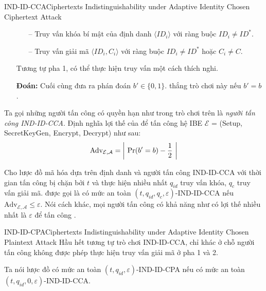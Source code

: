 \documentclass[class=report, crop=false]{standalone}
\begin{document}
\begin{game}{IND-ID-CCA}{Ciphertexts Indistinguishability under Adaptive Identity Chosen Ciphertext Attack}
\begin{itemize}[leftmargin=1.5cm, itemindent=-0.5cm]
					\begin{itemize}
						\item[--] Truy vấn khóa bí mật của định danh $\langle ID_i \rangle$ với ràng buộc $ID_i \neq ID^*$.
						\item[--] Truy vấn giải mã $\langle ID_i, C_i \rangle$ với ràng buộc $ID_i \neq ID^*$ hoặc $C_i \neq C$.
					\end{itemize}
					Tương tự pha 1, \adversary có thể thực hiện truy vấn một cách thích nghi.
					\item[] \textbf{Đoán:} Cuối cùng \adversary đưa ra phán đoán $b' \in \{0, 1\}$. \adversary thắng trò chơi này nếu $b' = b$.
				\end{itemize}
				\vspace{-\baselineskip}
				Ta gọi những người tấn công có quyền hạn như \adversary trong trò chơi trên là \textit{người tấn công IND-ID-CCA}. Định nghĩa lợi thế của \adversary để tấn công hệ IBE $\mathcal{E}$ = (\textsf{Setup, SecretKeyGen, Encrypt, Decrypt}) như sau:
				\[
					\text{Adv}_{\mathcal{E}, \mathcal{A}} = \left| \ \text{Pr}(b' = b) - \frac{1}{2} \ \right|
				\]
			\end{game}
			\begin{definition}\label{cca_def}
				Cho lược đồ mã hóa dựa trên định danh \scheme và người tấn công IND-ID-CCA \adversary với thời gian tấn công bị chặn bởi $t$ và thực hiện nhiều nhất $q_{id}$ truy vấn khóa, $q_c$ truy vấn giải mã. \scheme được gọi là có mức an toàn $(t, q_{id}, q_c, \varepsilon)$-IND-ID-CCA nếu $\text{Adv}_{\mathcal{E}, \mathcal{A}} \leq \varepsilon$. Nói cách khác, mọi người tấn công có khả năng như \adversary có lợi thế nhiều nhất là $\varepsilon$ để tấn công \scheme.
			\end{definition}
			\begin{game}{IND-ID-CPA}{Ciphertexts Indistinguishability under Adaptive Identity Chosen Plaintext Attack}
				Hầu hết tương tự trò chơi IND-ID-CCA, chỉ khác ở chỗ người tấn công không được phép thực hiện truy vấn giải mã ở pha 1 và 2.
			\end{game}
			\begin{definition}\label{cpa_def}
				Ta nói lược đồ \scheme có mức an toàn $(t, q_{id}, \varepsilon)$-IND-ID-CPA nếu \scheme có mức an toàn $(t, q_{id}, 0, \varepsilon)$-IND-ID-CCA.
			\end{definition}
\end{document}
